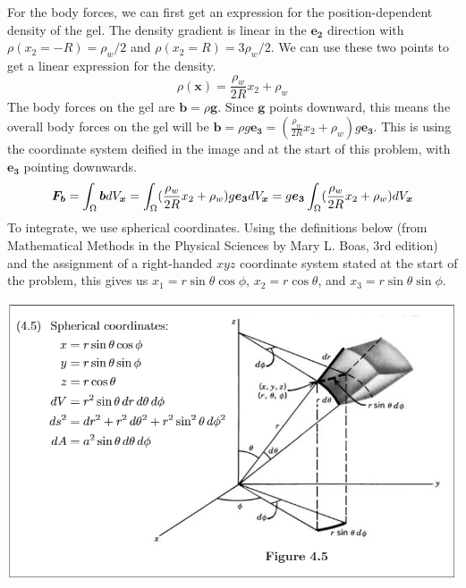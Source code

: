 \documentclass[preprint,12pt,authoryear]{elsarticle}
\begin{document}
For the body forces, we can first get an expression for the position-dependent density of the gel. The density gradient is linear in the $\bm{e_2}$ direction with $\rho(x_2 = -R) = \rho_w/2$ and $\rho(x_2 = R) = 3\rho_w/2$. We can use these two points to get a linear expression for the density.
\begin {equation}
    \rho(\bm{x}) = \frac{\rho_w}{2 R}x_2 + \rho_w
\end{equation}
The body forces on the gel are $\bm{b} = \rho \bm{g}$. Since $\bm{g}$ points downward, this means the overall body forces on the gel will be $\bm{b} = \rho g \bm{e_3} = (\frac{\rho_w}{2 R}x_2 + \rho_w)g \bm{e_3}$. This is using the coordinate system deified in the image and at the start of this problem, with $\bm{e_3}$ pointing downwards.
\begin{equation}
    \bm{F_b} =  \int_{\Omega}\bm{b} \space dV_{\bm{x}} =\int_{\Omega}  (\frac{\rho_w}{2 R}x_2 + \rho_w)g \bm{e_3} \space dV_{\bm{x}} = g \bm{e_3} \int_{\Omega}  (\frac{\rho_w}{2 R}x_2 + \rho_w) \space dV_{\bm{x}}
\end{equation}
To integrate, we use spherical coordinates. Using the definitions below (from Mathematical Methods in the Physical Sciences by Mary L. Boas, 3rd edition) and the assignment of a right-handed $xyz$ coordinate system stated at the start of the problem, this gives us $x_1 = r\sin{\theta}\cos{\phi}$, $x_2 = r\cos{\theta}$, and $x_3 = r\sin{\theta}\sin{\phi}$.

\includegraphics[scale=0.5]{Dawson-figures/boas-spherical.png}
\end{document}
